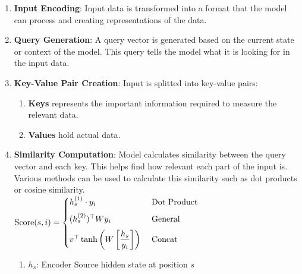 \begin{enumerate}
    \item \textbf{Input Encoding}: Input data is transformed into a format that the model can process and creating representations of the data.
    \hfill \cite{geeksforgeeks/artificial-intelligence/ml-attention-mechanism/}

    \item \textbf{Query Generation}: A query vector is generated based on the current state or context of the model. 
    This query tells the model what it is looking for in the input data.
    \hfill \cite{geeksforgeeks/artificial-intelligence/ml-attention-mechanism/}

    \item \textbf{Key-Value Pair Creation}: Input is splitted into key-value pairs:
    \hfill \cite{geeksforgeeks/artificial-intelligence/ml-attention-mechanism/}
    \begin{enumerate}
        \item \textbf{Keys} represents the important information required to measure the relevant data.
        \hfill \cite{geeksforgeeks/artificial-intelligence/ml-attention-mechanism/}
        
        \item \textbf{Values} hold actual data.
        \hfill \cite{geeksforgeeks/artificial-intelligence/ml-attention-mechanism/}
    \end{enumerate}

    \item \textbf{Similarity Computation}: Model calculates similarity between the query vector and each key. This helps find how relevant each part of the input is. 
    Various methods can be used to calculate this similarity such as dot products or cosine similarity.
    \hfill \cite{geeksforgeeks/artificial-intelligence/ml-attention-mechanism/}
    \\[0.2cm]
    $
        \text{Score}(s,i) = 
        \begin{cases}
            h_s^{(1)}\cdot y_i & \text{ Dot Product} \\[0.2cm]
            (h_s^{(2)})^\top Wy_i & \text{ General} \\[0.2cm]
            v^\top \tanh\left(W\left[\dfrac{h_s}{y_i}\right]\right) & \text{ Concat}
        \end{cases}
    $
    \hfill \cite{geeksforgeeks/artificial-intelligence/ml-attention-mechanism/}
    \\[0.2cm]
    \begin{enumerate}
        \item $h_s$: Encoder Source hidden state at position $s$
        \hfill \cite{geeksforgeeks/artificial-intelligence/ml-attention-mechanism/}


\end{enumerate}
\end{enumerate}
